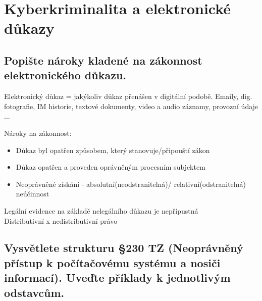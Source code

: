 \section{Kyberkriminalita a elektronické důkazy}

\subsection{Popište nároky kladené na zákonnost elektronického důkazu.}
Elektronický důkaz = jakýkoliv důkaz přenášen v digitální podobě. Emaily, dig. fotografie, IM historie, textové dokumenty, video a audio záznamy, provozní údaje ...

Nároky na zákonnost:\begin{itemize}
    \item Důkaz byl opatřen způsobem, který stanovuje/připouští zákon
    \item Důkaz opatřen a proveden oprávněným procesním subjektem
    \item Neoprávněné získání - absolutní(neodstranitelná)/ relativní(odstranitelná) neúčinnost
\end{itemize}
Legální evidence na základě nelegálního důkazu je nepřípustná\\
Distributivní x nedistributivní právo

\subsection{Vysvětlete strukturu §230 TZ (Neoprávněný přístup k počítačovému systému a nosiči informací). Uveďte příklady k jednotlivým odstavcům.}

